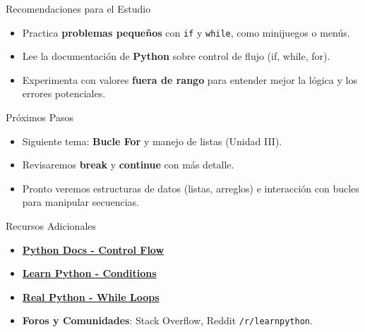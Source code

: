 \documentclass[10pt]{beamer}
\begin{document}
\begin{frame}{Recomendaciones para el Estudio}
  \begin{itemize}
    \item Practica \textbf{problemas pequeños} con \texttt{if} y \texttt{while}, como minijuegos o menús.
    \item Lee la documentación de \textbf{Python} sobre control de flujo (if, while, for).
    \item Experimenta con valores \textbf{fuera de rango} para entender mejor la lógica y los errores potenciales.
  \end{itemize}
\end{frame}

\begin{frame}{Próximos Pasos}
  \begin{itemize}
    \item Siguiente tema: \textbf{Bucle For} y manejo de listas (Unidad III).
    \item Revisaremos \textbf{break} y \textbf{continue} con más detalle.
    \item Pronto veremos estructuras de datos (listas, arreglos) e interacción con bucles para manipular secuencias.
  \end{itemize}
\end{frame}

\begin{frame}{Recursos Adicionales}
  \begin{itemize}
    \item \href{https://docs.python.org/3/tutorial/controlflow.html}{\textbf{Python Docs - Control Flow}}
    \item \href{https://www.learnpython.org/en/Conditions}{\textbf{Learn Python - Conditions}}
    \item \href{https://realpython.com/python-while-loop/}{\textbf{Real Python - While Loops}}
    \item \textbf{Foros y Comunidades}: Stack Overflow, Reddit \texttt{/r/learnpython}.
  \end{itemize}
\end{frame}
\end{document}
